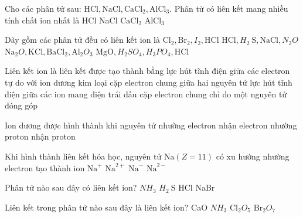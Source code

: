 	\begin{ex}
		Cho các phân tử sau: $\mathrm{HCl}, \mathrm{NaCl}, \mathrm{CaCl}_2, \mathrm{AlCl}_3$. Phân tử có liên kết mang nhiều tính chất ion nhất là
		\choice
		{HCl}
		{\True NaCl}
		{$\mathrm{CaCl}_2$}
		{$\mathrm{AlCl}_3$}
		\loigiai{}
	\end{ex}
	
	\begin{ex}
		Dãy gồm các phân tử đều có liên kết ion là
		\choice
		{$\mathrm{Cl}_2, \mathrm{Br}_2, I_2, \mathrm{HCl}$}
		{$\mathrm{HCl}, H_2\mathrm{~S}, \mathrm{NaCl}, N_2O$}
		{\True $\mathrm{Na}_2O, \mathrm{KCl}, \mathrm{BaCl}_2, \mathrm{Al}_2O_3$}
		{$\mathrm{MgO}, H_2SO_4, H_3PO_4, \mathrm{HCl}$}
		\loigiai{}
	\end{ex}

	\begin{ex}
		Liên kết ion là liên kết được tạo thành bằng
		\choice
		{lực hút tĩnh điện giữa các electron tự do với ion dương kim loại}
		{cặp electron chung giữa hai nguyên tử}
		{\True lực hút tĩnh điện giữa các ion mang điện trái dấu}
		{cặp electron chung chỉ do một nguyên tử đóng góp}
		\loigiai{}
	\end{ex}
	
	\begin{ex}
		Ion dương được hình thành khi nguyên tử
		\choice
		{\True nhường electron}
		{nhận electron}
		{nhường proton}
		{nhận proton}
		\loigiai{}
	\end{ex}
	
	\begin{ex}
		Khi hình thành liên kết hóa học, nguyên tử $\mathrm{Na}(Z=11)$ có xu hướng nhường electron tạo thành ion
		\choice
		{\True $\mathrm{Na}^{+}$}
		{$\mathrm{Na}^{2+}$}
		{$\mathrm{Na}^{-}$}
		{$\mathrm{Na}^{2-}$}
		\loigiai{}
	\end{ex}
	
	\begin{ex}
		Phân tử nào sau đây có liên kết ion?
		\choice
		{$NH_3$}
		{$H_2\mathrm{~S}$}
		{HCl}
		{\True NaBr}
		\loigiai{}
	\end{ex}
	
	\begin{ex}
		Liên kết trong phân tử nào sau đây là liên kết ion?
		\choice
		{\True CaO}
		{$NH_3$}
		{$\mathrm{Cl}_2O_5$}
		{$\mathrm{Br}_2O_7$}
		\loigiai{}
	\end{ex}
	
